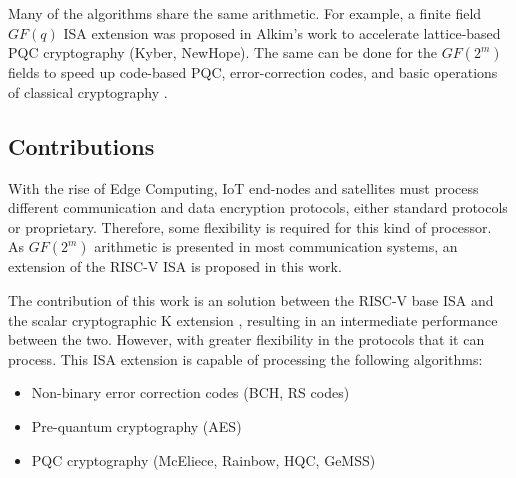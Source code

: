 Many of the algorithms share the same arithmetic. For example, a finite field $GF(q)$ ISA extension 
was proposed in Alkim's \cite{Alkim_Evkan_Lahr_Niederhagen_Petri_2020} work to accelerate lattice-based PQC 
cryptography (Kyber, NewHope). The same can be done for the $GF(2^m)$ fields to speed up code-based PQC, 
error-correction codes, and basic operations of classical cryptography \cite{10.1145/944645.944659}.

\subsection{Contributions}

With the rise of Edge Computing, IoT end-nodes \cite{8123913} and satellites \cite{8945402} must process different communication and data encryption protocols, 
either standard protocols or proprietary. Therefore, some flexibility is required for this kind of processor.
As $GF(2^m) $ arithmetic is presented in most communication systems, an extension of the RISC-V ISA is proposed in this work. 

The contribution of this work is an solution between the RISC-V base ISA and the scalar cryptographic K extension \cite{zehrisc}, resulting in an 
intermediate performance between the two. However, with greater flexibility in the protocols that it can process. This ISA extension is capable of 
processing the following algorithms:

\begin{itemize}
    \item Non-binary error correction codes (BCH, RS codes)
    \item Pre-quantum cryptography (AES) 
    \item PQC cryptography (McEliece, Rainbow, HQC, GeMSS)
\end{itemize}



